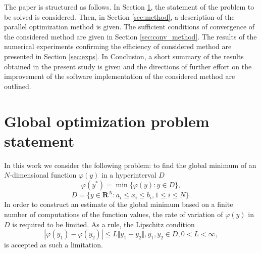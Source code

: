 \documentclass[runningheads]{llncs}
\begin{document}
The paper is structured as follows. In Section \ref{sec:problem}, the statement of the problem to
be solved is considered. Then, in Section \ref{sec:method}, a description of the parallel
optimization method is given. The sufficient conditions of convergence of the considered
method are given in Section \ref{sec:conv_method}.
The results of the numerical experiments confirming the efficiency of considered method are
presented in Section \ref{sec:exps}.
In Conclusion, a short summary of the results obtained in the present study is given and the
directions of further effort on the improvement of the software implementation of the
considered method are outlined.


\section{Global optimization problem statement}
\label{sec:problem}
In this work we consider the following 
problem: to find the global minimum of an \(N\)-dimensional function \(\varphi(y)\) in
a hyperinterval $D$
\begin{equation}
\label{eq:task}
\varphi(y^*)=\min\{\varphi(y):y\in D\},
\end{equation}
\begin{displaymath}
D=\{y\in \mathbf{R}^N:a_i\leqslant x_i\leqslant{b_i}, 1\leqslant{i}\leqslant{N}\}.
\end{displaymath}
In order to construct an estimate of the global minimum based on a finite number of
computations of the function values, the rate of variation of \(\varphi(y)\) in \(D\) is required to
be limited.
As a rule, the Lipschitz condition 
\begin{displaymath}
\label{lip}
|\varphi(y_1)-\varphi(y_2)|\leqslant L\Vert y_1-y_2\Vert,y_1,y_2\in D,0<L<\infty,
\end{displaymath}
is accepted as such a limitation.
\end{document}
